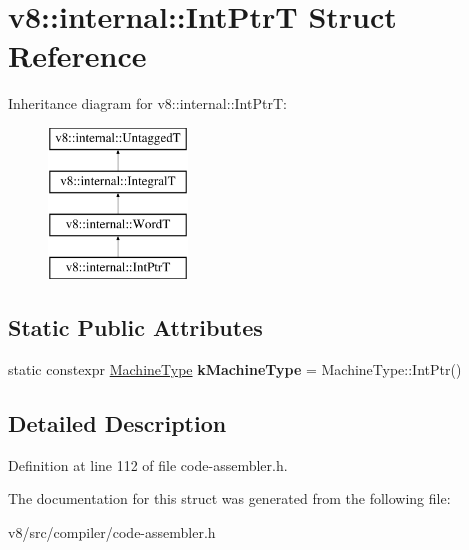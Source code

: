 \hypertarget{structv8_1_1internal_1_1IntPtrT}{}\section{v8\+:\+:internal\+:\+:Int\+PtrT Struct Reference}
\label{structv8_1_1internal_1_1IntPtrT}
Inheritance diagram for v8\+:\+:internal\+:\+:Int\+PtrT\+:\begin{figure}[H]
\begin{center}
\leavevmode
\includegraphics[height=4.000000cm]{structv8_1_1internal_1_1IntPtrT}
\end{center}
\end{figure}
\subsection*{Static Public Attributes}
\begin{DoxyCompactItemize}
\item 
\mbox{\label{structv8_1_1internal_1_1IntPtrT_aba85802feb62754caa78fe446d36f24c}} 
static constexpr \mbox{\hyperlink{classv8_1_1internal_1_1MachineType}{Machine\+Type}} {\bfseries k\+Machine\+Type} = Machine\+Type\+::\+Int\+Ptr()
\end{DoxyCompactItemize}


\subsection{Detailed Description}


Definition at line 112 of file code-\/assembler.\+h.



The documentation for this struct was generated from the following file\+:\begin{DoxyCompactItemize}
\item 
v8/src/compiler/code-\/assembler.\+h\end{DoxyCompactItemize}
